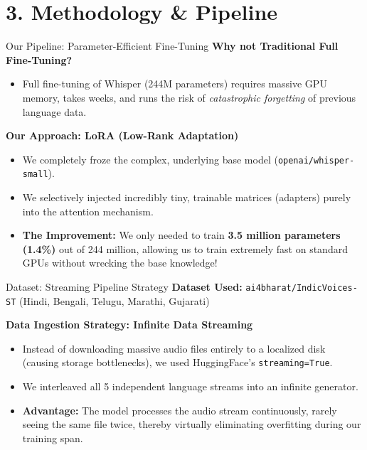 \documentclass[aspectratio=169]{beamer}
\begin{document}
\section{3. Methodology \& Pipeline}
\begin{frame}{Our Pipeline: Parameter-Efficient Fine-Tuning}
    \textbf{Why not Traditional Full Fine-Tuning?}
    \begin{itemize}
        \item Full fine-tuning of Whisper (244M parameters) requires massive GPU memory, takes weeks, and runs the risk of \textit{catastrophic forgetting} of previous language data.
    \end{itemize}
    \vspace{0.3cm}
    \textbf{Our Approach: LoRA (Low-Rank Adaptation)}
    \begin{itemize}
        \item We completely froze the complex, underlying base model (\texttt{openai/whisper-small}).
        \item We selectively injected incredibly tiny, trainable matrices (adapters) purely into the attention mechanism.
        \item \textbf{The Improvement:} We only needed to train \textbf{3.5 million parameters (1.4\%)} out of 244 million, allowing us to train extremely fast on standard GPUs without wrecking the base knowledge!
    \end{itemize}
\end{frame}

\begin{frame}{Dataset: Streaming Pipeline Strategy}
    \textbf{Dataset Used:} \texttt{ai4bharat/IndicVoices-ST} (Hindi, Bengali, Telugu, Marathi, Gujarati)
    \vspace{0.3cm}
    
    \textbf{Data Ingestion Strategy: Infinite Data Streaming} 
    \begin{itemize}
        \item Instead of downloading massive audio files entirely to a localized disk (causing storage bottlenecks), we used HuggingFace's \texttt{streaming=True}.
        \item We interleaved all 5 independent language streams into an infinite generator.
        \item \textbf{Advantage:} The model processes the audio stream continuously, rarely seeing the same file twice, thereby virtually eliminating overfitting during our training span.
    \end{itemize}
\end{frame}
\end{document}
